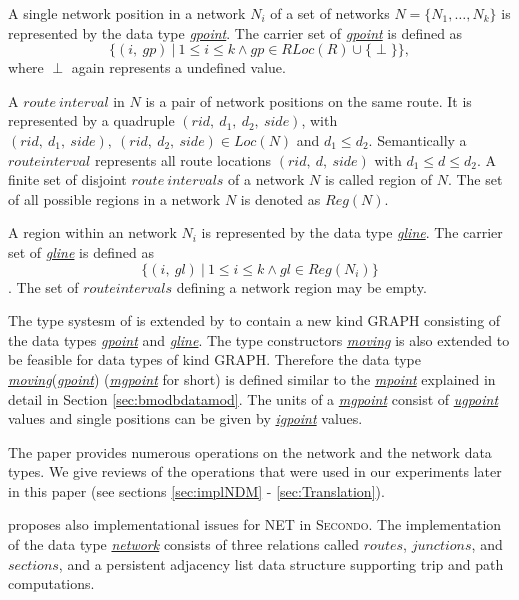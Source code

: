 \documentclass[a4paper]{article}
\newcommand{\secondo}{\textsc{Secondo}}
\newcommand{\dt}[1]{\textsl{\underline{#1}}}
\begin{document}
A single network position in a network $N_i$ of a set of networks 
$N=\{N_1,\ldots,N_k\}$
is represented by the data type \dt{gpoint}. The carrier set of \dt{gpoint} is 
defined as
\[\{(i,\ gp)\ |\ 1 \leq i \leq k \wedge gp \in RLoc(R) \cup \{ \perp \}\},\]
where $\perp$ again represents a undefined value.

A $route\ interval$ in $N$ is a pair of network positions on the same route. It
is represented by a quadruple $(rid,\ d_1,\ d_2,\ side)$, with
$(rid,\ d_1,\ side),\ (rid,\ d_2,\ side) \in Loc(N)$
and $d_1 \leq d_2$. Semantically
a $route interval$ represents all route locations $(rid,\ d,\ side)$ with
$d_1 \leq d \leq d_2$. A finite set of disjoint $route\ intervals$ of a network
$N$ is called region of $N$. The set of all possible regions in a network $N$ is
denoted as $Reg(N)$.

A region within an network $N_i$ is represented by the data type \dt{gline}.
The carrier set of \dt{gline} is defined as
\[\{(i,\ gl)\ |\ 1 \leq i \leq k \wedge gl \in Reg(N_i) \}\].
The set of $route intervals$ defining a network region may be empty.

The type systesm of \cite{RepresentingMovingObjectsGueting} is extended by
\cite{NetworkGueting} to contain a new kind GRAPH consisting of the data types
\dt{gpoint} and \dt{gline}. The type constructors \dt{moving} is also extended
to be feasible for data types of kind GRAPH. Therefore the data type
\dt{moving}(\dt{gpoint}) (\dt{mgpoint} for short) is defined similar to the
\dt{mpoint} explained in detail in Section \ref{sec:bmodbdatamod}. The units of
a \dt{mgpoint} consist of \dt{ugpoint} values and single positions can be given
by \dt{igpoint} values.

The paper provides numerous operations on the network and the network data types.
We give reviews of the operations that were used in our experiments later in this
paper (see sections \ref{sec:implNDM} - \ref{sec:Translation}).

\cite{NetworkGueting} proposes also implementational issues for NET in
\secondo{}. The implementation of the data type \dt{network} consists of three
relations called $routes$, $junctions$, and $sections$, and a persistent adjacency
list data structure supporting trip and path computations.
\end{document}
